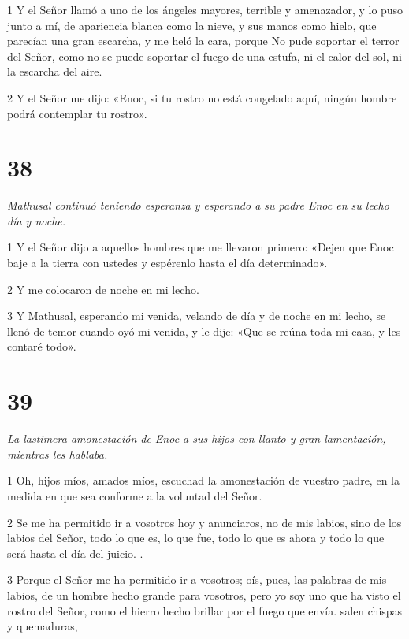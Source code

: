 \par 1 Y el Señor llamó a uno de los ángeles mayores, terrible y amenazador, y lo puso junto a mí, de apariencia blanca como la nieve, y sus manos como hielo, que parecían una gran escarcha, y me heló la cara, porque No pude soportar el terror del Señor, como no se puede soportar el fuego de una estufa, ni el calor del sol, ni la escarcha del aire.

\par 2 Y el Señor me dijo: «Enoc, si tu rostro no está congelado aquí, ningún hombre podrá contemplar tu rostro».

\chapter{38}

\par \textit{Mathusal continuó teniendo esperanza y esperando a su padre Enoc en su lecho día y noche.}

\par 1 Y el Señor dijo a aquellos hombres que me llevaron primero: «Dejen que Enoc baje a la tierra con ustedes y espérenlo hasta el día determinado».

\par 2 Y me colocaron de noche en mi lecho.

\par 3 Y Mathusal, esperando mi venida, velando de día y de noche en mi lecho, se llenó de temor cuando oyó mi venida, y le dije: «Que se reúna toda mi casa, y les contaré todo».

\chapter{39}

\par \textit{La lastimera amonestación de Enoc a sus hijos con llanto y gran lamentación, mientras les hablaba.}

\par 1 Oh, hijos míos, amados míos, escuchad la amonestación de vuestro padre, en la medida en que sea conforme a la voluntad del Señor.

\par 2 Se me ha permitido ir a vosotros hoy y anunciaros, no de mis labios, sino de los labios del Señor, todo lo que es, lo que fue, todo lo que es ahora y todo lo que será hasta el día del juicio. .

\par 3 Porque el Señor me ha permitido ir a vosotros; oís, pues, las palabras de mis labios, de un hombre hecho grande para vosotros, pero yo soy uno que ha visto el rostro del Señor, como el hierro hecho brillar por el fuego que envía. salen chispas y quemaduras,

